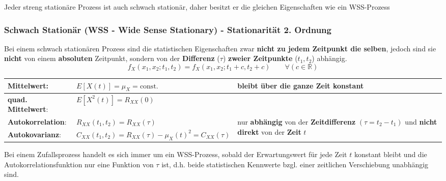 Jeder streng stationäre Prozess ist auch schwach stationär, daher besitzt er die gleichen Eigenschaften wie ein WSS-Prozess

\subsubsection{Schwach Stationär (WSS - Wide Sense Stationary) - Stationarität 2. Ordnung}
Bei einem schwach stationären Prozess sind die statistischen Eigenschaften zwar
\textbf{nicht zu jedem Zeitpunkt die selben}, jedoch sind sie \textbf{nicht} von einem \textbf{absoluten} Zeitpunkt, sondern
von der \textbf{Differenz} ($\tau$) \textbf{zweier Zeitpunkte} ($t_1, t_2$) abhängig.  \\ 
\vspace{-0.2cm}
$$ f_X(x_1, x_2; t_1, t_2) = f_X(x_1, x_2; t_1+c, t_2+c) \qquad \forall (c \in \mathbb{R})$$

\renewcommand{\arraystretch}{1.4}
\begin{tabular}[c]{ |p{3.3cm}|  p{6.5cm} |p{8cm}| }
	\hline
	\textbf{Mittelwert}: 	&  $E[X(t)] = \mu_{X} = \text{const.}$  
							& bleibt über die ganze Zeit konstant\\ 
	\hline
	\textbf{quad. Mittelwert}: 	&  $E[X^{2}(t)] = R_{XX}(0)$ &  \\ 
	\hline
	\textbf{Autokorrelation}: 	& 	$R_{XX}(t_{1},t_{2}) = R_{XX}(\tau)$
	& \multirow{2}{8cm}{nur \textbf{abhängig} von der \textbf{Zeitdifferenz} $(\tau = t_2 - t_1)$ und \textbf{nicht direkt} von der \textbf{Zeit} $t$}\\
	 \cline{1-2}
	 \textbf{Autokovarianz}:		& $ C_{XX}(t_{1},t_{2}) = R_{XX}(\tau) - \mu_{X}(t)^{2} = C_{XX}(\tau)$ & \\
	 \hline
\end{tabular}
\renewcommand{\arraystretch}{1}
 
Bei einem Zufallsprozess handelt es sich immer um ein WSS-Prozess, sobald der Erwartungswert
für jede Zeit $t$ konstant bleibt und die Autokorrelationsfunktion nur eine Funktion von $\tau$ ist,
d.h. beide statistischen Kennwerte bzgl. einer zeitlichen Verschiebung unabhängig sind.    
        


